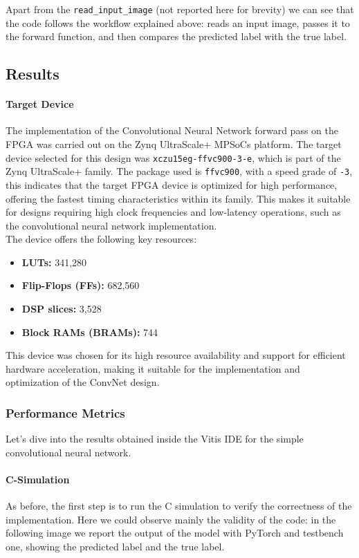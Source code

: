 \documentclass{article}
\begin{document}
Apart from the \texttt{read\_input\_image} (not reported here for brevity) we can see that the code follows the workflow explained above: reads an input image, passes it to the forward function, and then compares the predicted label with the true label.

\newpage
\subsection{Results}

\paragraph{Target Device}
The implementation of the Convolutional Neural Network forward pass on the FPGA was carried out on the Zynq UltraScale+ MPSoCs platform. The target device selected for this design was \texttt{xczu15eg-ffvc900-3-e}, which is part of the Zynq UltraScale+ family. The package used is \texttt{ffvc900}, with a speed grade of \texttt{-3}, this indicates that the target FPGA device is optimized for high performance, offering the fastest timing characteristics within its family. This makes it suitable for designs requiring high clock frequencies and low-latency operations, such as the convolutional neural network implementation.\\

The device offers the following key resources:
\begin{itemize}
    \item \textbf{LUTs:} 341,280
    \item \textbf{Flip-Flops (FFs):} 682,560
    \item \textbf{DSP slices:} 3,528
    \item \textbf{Block RAMs (BRAMs):} 744
\end{itemize}

This device was chosen for its high resource availability and support for efficient hardware acceleration, making it suitable for the implementation and optimization of the ConvNet design.


\subsubsection{Performance Metrics}
Let's dive into the results obtained inside the Vitis IDE for the simple convolutional neural network. 


\paragraph{C-Simulation}
As before, the first step is to run the C simulation to verify the correctness of the implementation. Here we could observe mainly the validity of the code: in the following image we report the output of the model with PyTorch and testbench one, showing the predicted label and the true label.
\end{document}
